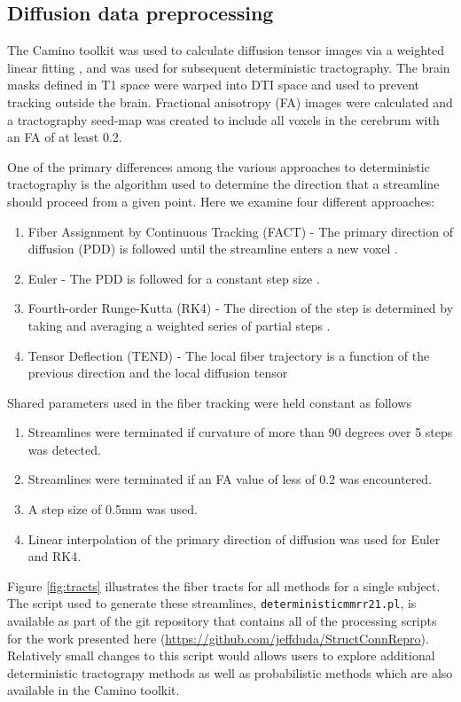 \documentclass{frontiersSCNS} %
\begin{document}
\subsection{Diffusion data preprocessing}
The Camino toolkit \citep{Cook2006} was used to calculate diffusion tensor images via a
weighted linear fitting \citep{Basser1994c,Salvador2005b}, and was 
used for subsequent deterministic tractography. The brain masks defined
in T1 space were warped into DTI space and used to prevent tracking outside the brain. 
Fractional anisotropy (FA) images were calculated and a
tractography seed-map was created to include all voxels in the cerebrum with an FA of at
least 0.2. 

One of the primary differences among the various approaches to
deterministic tractography is the algorithm used to determine the
direction that a streamline should proceed from a given point. Here we
examine four different approaches:

\begin{enumerate}
\item Fiber Assignment by Continuous Tracking (FACT) - The primary
  direction of diffusion (PDD) is followed until the streamline enters
  a new voxel \citep{Xue1999}.
\item Euler -  The PDD is followed for a constant step size \citep{Basser2000}.
\item Fourth-order Runge-Kutta (RK4) - The direction of the step is determined
 by taking and averaging a weighted series of partial steps \citep{Basser2000}.
\item Tensor Deflection (TEND) - The local fiber trajectory is a function of the previous
direction and the local diffusion tensor \citep{Lazar2003}
\end{enumerate}

Shared parameters used in the fiber tracking were held constant as follows
\begin{enumerate}
\item Streamlines were terminated if curvature of more than 90 degrees over 5 steps was detected. 
\item Streamlines were terminated if an FA value of less of 0.2 was encountered. 
\item A step size of 0.5mm was used. 
\item Linear interpolation of the primary direction of diffusion was used for Euler and RK4. 
\end{enumerate}

Figure \ref{fig:tracts} illustrates the fiber tracts for all methods for a single subject. The script used to generate these streamlines,
\texttt{deterministic\textunderscore mmrr21.pl}, is available as part of the git
repository that contains all of the processing scripts for the work
presented here (\url{https://github.com/jeffduda/StructConnRepro}). Relatively small
changes to this script would allows users to explore additional
deterministic tractograpy methods as well as probabilistic methods
which are also available in the Camino toolkit.
\end{document}
